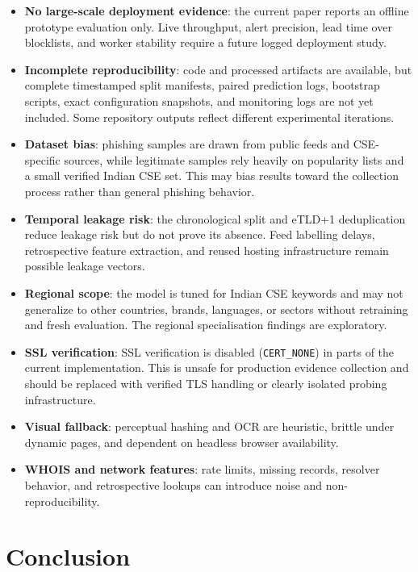 \documentclass[conference]{IEEEtran}
\begin{document}
\begin{itemize}
    \item \textbf{No large-scale deployment evidence}: the current paper reports an offline prototype evaluation only. Live throughput, alert precision, lead time over blocklists, and worker stability require a future logged deployment study.
    \item \textbf{Incomplete reproducibility}: code and processed artifacts are available, but complete timestamped split manifests, paired prediction logs, bootstrap scripts, exact configuration snapshots, and monitoring logs are not yet included. Some repository outputs reflect different experimental iterations.
    \item \textbf{Dataset bias}: phishing samples are drawn from public feeds and CSE-specific sources, while legitimate samples rely heavily on popularity lists and a small verified Indian CSE set. This may bias results toward the collection process rather than general phishing behavior.
    \item \textbf{Temporal leakage risk}: the chronological split and eTLD+1 deduplication reduce leakage risk but do not prove its absence. Feed labelling delays, retrospective feature extraction, and reused hosting infrastructure remain possible leakage vectors.
    \item \textbf{Regional scope}: the model is tuned for Indian CSE keywords and may not generalize to other countries, brands, languages, or sectors without retraining and fresh evaluation. The regional specialisation findings are exploratory.
    \item \textbf{SSL verification}: SSL verification is disabled (\texttt{CERT\_NONE}) in parts of the current implementation. This is unsafe for production evidence collection and should be replaced with verified TLS handling or clearly isolated probing infrastructure.
    \item \textbf{Visual fallback}: perceptual hashing and OCR are heuristic, brittle under dynamic pages, and dependent on headless browser availability.
    \item \textbf{WHOIS and network features}: rate limits, missing records, resolver behavior, and retrospective lookups can introduce noise and non-reproducibility.
\end{itemize}

\section{Conclusion}
\end{document}
